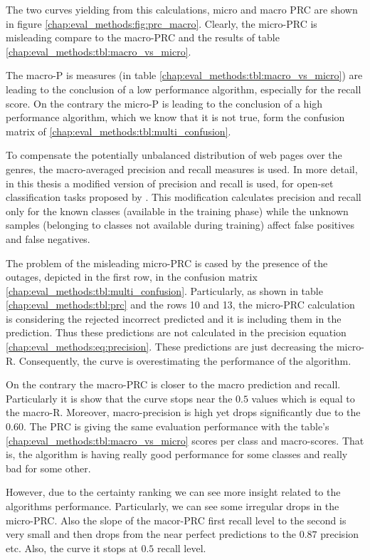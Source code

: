 The two curves yielding from this calculations, micro and macro PRC are shown in figure \ref{chap:eval_methods:fig:prc_macro}. Clearly, the micro-PRC is misleading compare to the macro-PRC and the results of table \ref{chap:eval_methods:tbl:macro_vs_micro}. 

The macro-P is measures (in table \ref{chap:eval_methods:tbl:macro_vs_micro}) are leading to the conclusion of a low performance algorithm, especially for the recall score. On the contrary the micro-P is leading to the conclusion of a high performance algorithm, which we know that it is not true, form the confusion matrix of \ref{chap:eval_methods:tbl:multi_confusion}.

To compensate the potentially unbalanced distribution of web pages over the genres, the macro-averaged precision and recall measures is used. In more detail, in this thesis a modified version of precision and recall is used, for open-set classification tasks proposed by \parencite{mendesjunior2016}. This modification calculates precision and recall only for the known classes (available in the training phase) while the unknown samples (belonging to classes not available during training) affect false positives and false negatives.

The problem of the misleading micro-PRC is cased by the presence of the outages, depicted in the first row, in the confusion matrix \ref{chap:eval_methods:tbl:multi_confusion}. Particularly, as shown in table \ref{chap:eval_methods:tbl:prc} and the rows 10 and 13, the micro-PRC calculation is considering the rejected incorrect predicted and it is including them in the prediction. Thus these predictions are not calculated in the precision equation \ref{chap:eval_methods:eq:precision}. These predictions are just decreasing the micro-R. Consequently, the curve is overestimating the performance of the algorithm.

On the contrary the macro-PRC is closer to the macro prediction and recall. Particularly it is show that the curve stops near the $0.5$ values which is equal to the macro-R. Moreover, macro-precision is high yet drops significantly due to the $0.60$. The PRC is giving the same evaluation performance with the table's \ref{chap:eval_methods:tbl:macro_vs_micro} scores per class and macro-scores. That is, the algorithm is having really good performance for some classes and really bad for some other.

However, due to the certainty ranking we can see more insight related to the algorithms performance. Particularly, we can see some irregular drops in the micro-PRC. Also the slope of the macor-PRC first recall level to the second is very small and then drops from the near perfect predictions to the $0.87$ precision etc. Also, the curve it stops at $0.5$ recall level.

